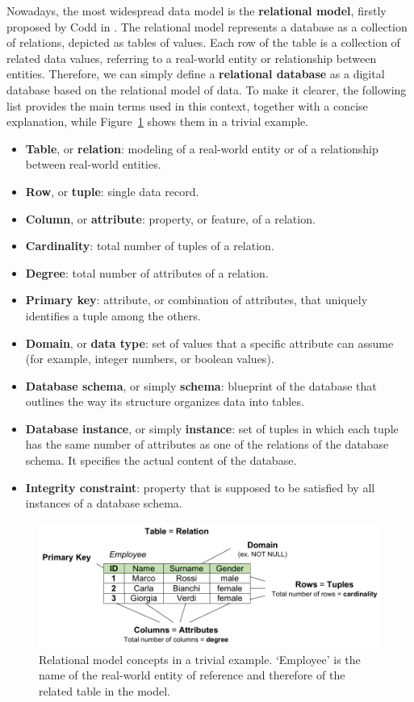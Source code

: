 Nowadays, the most widespread data model is the \textbf{relational model}, firstly proposed by Codd in \cite{codd1970relational}. The relational model represents a database as a collection of relations, depicted as tables of values. Each row of the table is a collection of related data values, referring to a real-world entity or relationship between entities. Therefore, we can simply define a \textbf{relational database} as a digital database based on the relational model of data.
To make it clearer, the following list provides the main terms used in this context, together with a concise explanation, while Figure~\ref{fig:relational_model} shows them in a trivial example.
\begin{itemize}
\item \textbf{Table}, or \textbf{relation}: modeling of a real-world entity or of a relationship between real-world entities.
\item \textbf{Row}, or \textbf{tuple}: single data record.
\item \textbf{Column}, or \textbf{attribute}: property, or feature, of a relation.
\item \textbf{Cardinality}: total number of tuples of a relation.
\item \textbf{Degree}: total number of attributes of a relation.
\item \textbf{Primary key}: attribute, or combination of attributes, that uniquely identifies a tuple among the others.
\item \textbf{Domain}, or \textbf{data type}: set of values that a specific attribute can assume (for example, integer numbers, or boolean values).
\item \textbf{Database schema}, or simply \textbf{schema}: blueprint of the database that outlines the way its structure organizes data into tables.
\item \textbf{Database instance}, or simply \textbf{instance}: set of tuples in which each tuple has the same number of attributes as one of the relations of the database schema. It specifies the actual content of the database.
\item \textbf{Integrity constraint}: property that is supposed to be satisfied by all instances of a database schema.
\end{itemize} 

\begin{figure}[t!]
\includegraphics[scale=.75]{figures/relational_model.pdf}
\centering
\caption{Relational model concepts in a trivial example. `Employee' is the name of the real-world entity of reference and therefore of the related table in the model.}
\label{fig:relational_model}
\end{figure}

